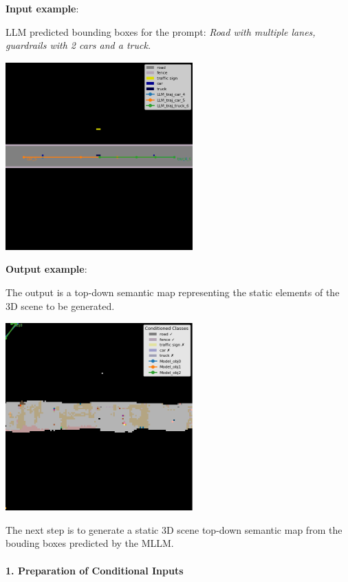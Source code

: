 \documentclass{article}
\begin{document}
\begin{tcolorbox}

\textbf{Input example}:

LLM predicted bounding boxes for the prompt: \emph{Road with multiple lanes, guardrails with 2 cars and a truck.}

\includegraphics[width=0.6\linewidth]{images/highway_scene_llm.png}

\textbf{Output example}:

The output is a top-down semantic map representing the static elements of the 3D scene to be generated.

\includegraphics[width=0.6\linewidth]{images/highway_scene_diffusion.png}

\end{tcolorbox}

The next step is to generate a static 3D scene top-down semantic map from the bouding boxes predicted by the MLLM.

\paragraph{1. Preparation of Conditional Inputs}
\end{document}
